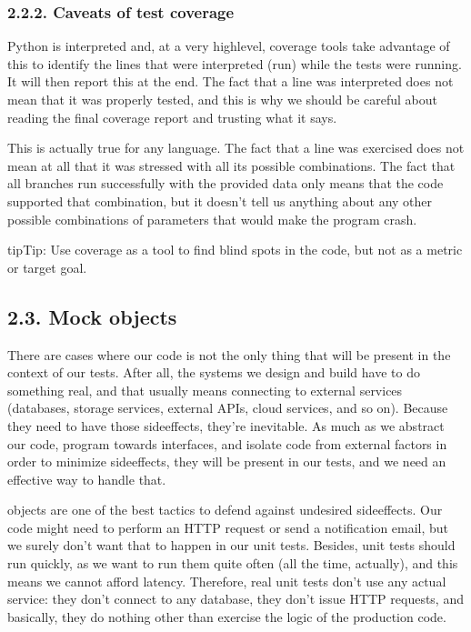 \documentclass[a4paper,10pt,english]{sphinxmanual}
\begin{document}
\subsubsection{2.2.2. Caveats of test coverage}
\label{\detokenize{chapters/8_unit_testing/index:caveats-of-test-coverage}}
Python is interpreted and, at a very high\sphinxhyphen{}level, coverage tools take advantage of this to
identify the lines that were interpreted (run) while the tests were running. It will then
report this at the end. The fact that a line was interpreted does not mean that it was
properly tested, and this is why we should be careful about reading the final coverage
report and trusting what it says.

This is actually true for any language. The fact that a line was exercised does not mean at all
that it was stressed with all its possible combinations. The fact that all branches run
successfully with the provided data only means that the code supported that combination,
but it doesn’t tell us anything about any other possible combinations of parameters that
would make the program crash.

\begin{sphinxadmonition}{tip}{Tip:}
Use coverage as a tool to find blind spots in the code, but not as a metric
or target goal.
\end{sphinxadmonition}


\subsection{2.3. Mock objects}
\label{\detokenize{chapters/8_unit_testing/index:mock-objects}}
There are cases where our code is not the only thing that will be present in the context of
our tests. After all, the systems we design and build have to do something real, and that
usually means connecting to external services (databases, storage services, external APIs,
cloud services, and so on). Because they need to have those side\sphinxhyphen{}effects, they’re inevitable.
As much as we abstract our code, program towards interfaces, and isolate code from
external factors in order to minimize side\sphinxhyphen{}effects, they will be present in our tests, and we
need an effective way to handle that.

 objects are one of the best tactics to defend against undesired side\sphinxhyphen{}effects. Our code
might need to perform an HTTP request or send a notification email, but we surely don’t
want that to happen in our unit tests. Besides, unit tests should run quickly, as we want to
run them quite often (all the time, actually), and this means we cannot afford latency.
Therefore, real unit tests don’t use any actual service: they don’t connect to any database,
they don’t issue HTTP requests, and basically, they do nothing other than exercise the logic
of the production code.
\end{document}
